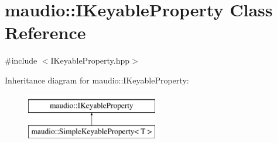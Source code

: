 \hypertarget{classmaudio_1_1IKeyableProperty}{\section{maudio\-:\-:I\-Keyable\-Property Class Reference}
\label{classmaudio_1_1IKeyableProperty}
}


{\ttfamily \#include $<$I\-Keyable\-Property.\-hpp$>$}

Inheritance diagram for maudio\-:\-:I\-Keyable\-Property\-:\begin{figure}[H]
\begin{center}
\leavevmode
\includegraphics[height=2.000000cm]{classmaudio_1_1IKeyableProperty}
\end{center}
\end{figure}

